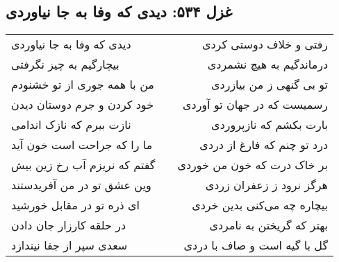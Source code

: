 \begin{center}
\section*{غزل ۵۳۴: دیدی که وفا به جا نیاوردی}
\label{sec:534}
\begin{longtable}{l p{0.5cm} r}
دیدی که وفا به جا نیاوردی
&&
رفتی و خلاف دوستی کردی
\\
بیچارگیم به چیز نگرفتی
&&
درماندگیم به هیچ نشمردی
\\
من با همه جوری از تو خشنودم
&&
تو بی گنهی ز من بیازردی
\\
خود کردن و جرم دوستان دیدن
&&
رسمیست که در جهان تو آوردی
\\
نازت ببرم که نازک اندامی
&&
بارت بکشم که نازپروردی
\\
ما را که جراحت است خون آید
&&
درد تو چنم که فارغ از دردی
\\
گفتم که نریزم آب رخ زین بیش
&&
بر خاک درت که خون من خوردی
\\
وین عشق تو در من آفریدستند
&&
هرگز نرود ز زعفران زردی
\\
ای ذره تو در مقابل خورشید
&&
بیچاره چه می‌کنی بدین خردی
\\
در حلقه کارزار جان دادن
&&
بهتر که گریختن به نامردی
\\
سعدی سپر از جفا نیندازد
&&
گل با گیه است و صاف با دردی
\\
\end{longtable}
\end{center}
